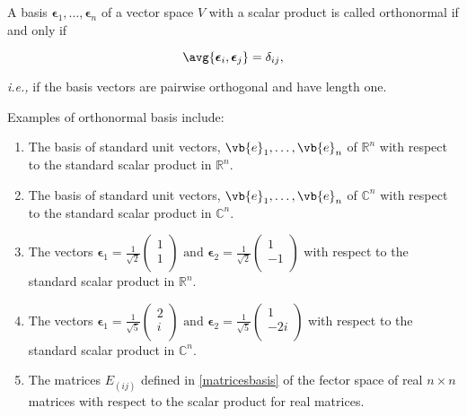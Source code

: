 \documentclass[a4paper,12pt]{report}
\begin{document}
\begin{definition}
A basis \(\boldsymbol{\epsilon  }_{1} , \ldots   , \boldsymbol{\epsilon}_{n}    \) of a vector space \(V\) with a scalar product is called orthonormal if and only if

\begin{equation}
    \avg{\boldsymbol{\epsilon }_{i} , \boldsymbol{\epsilon } _{j}   } = \delta _{ij},
\end{equation}

\textit{i.e.,} if the basis vectors are pairwise orthogonal and have length one.

\end{definition}

Examples of orthonormal basis include:

\begin{enumerate}
    \item The basis of standard unit vectors, \(\vb{e}_1, \ldots, \vb{e}_n \) of \(\mathbb{R}^{n}\) with respect to the standard scalar product in \(\mathbb{R}^{n}\).
    \item The basis of standard unit vectors, \(\vb{e}_1, \ldots, \vb{e}_n \) of \(\mathbb{C}^{n}\) with respect to the standard scalar product in \(\mathbb{C}^{n}\).
    \item The vectors \(    \boldsymbol{\epsilon } _{1} = \frac{1}{\sqrt{2} } \begin{pmatrix}
        1 \\
        1 \\
   \end{pmatrix} \text { and } \boldsymbol{\epsilon } _{2} = \frac{1}{\sqrt{2} } \begin{pmatrix}
        1 \\
        -1 \\
   \end{pmatrix}  \) with respect to the standard scalar product in \(\mathbb{R}^{n} \). 
   \item The vectors \(    \boldsymbol{\epsilon }_{1} = \frac{1}{\sqrt{5} } \begin{pmatrix}
    2 \\
    i \\
\end{pmatrix} \text { and } \boldsymbol{\epsilon }_{2}= \frac{1}{\sqrt{5} } \begin{pmatrix}
    1 \\
    -2i \\
\end{pmatrix}   \) with respect to the standard scalar product in \(\mathbb{C}^{n} \). 
\item The matrices \(E_{(ij)} \) defined in \cref{matricesbasis} of the fector space of real \(n \times  n\) matrices with respect to the scalar product for real matrices.  
\end{enumerate}
\end{document}
